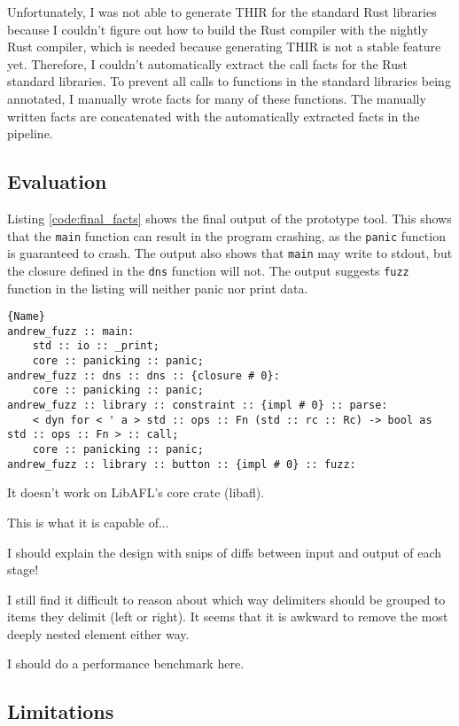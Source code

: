\documentclass[11pt]{article}
\begin{document}
Unfortunately, I was not able to generate THIR for the standard Rust libraries because I couldn't figure out how to build the Rust compiler with the nightly Rust compiler, which is needed because generating THIR is not a stable feature yet.
Therefore, I couldn't automatically extract the call facts for the Rust standard libraries.
To prevent all calls to functions in the standard libraries being annotated, I manually wrote facts for many of these functions.
The manually written facts are concatenated with the automatically extracted facts in the pipeline.

\subsection{Evaluation}

Listing \ref{code:final_facts} shows the final output of the prototype tool.
This shows that the \lstinline{main} function can result in the program crashing, as the \lstinline{panic} function is guaranteed to crash.
The output also shows that \lstinline{main} may write to stdout, but the closure defined in the \lstinline{dns} function will not.
The output suggests \lstinline{fuzz} function in the listing will neither panic nor print data.

\begin{lstlisting}[caption=External Function Annotions, label=code:final_facts]{Name}
andrew_fuzz :: main:
	std :: io :: _print;
	core :: panicking :: panic;
andrew_fuzz :: dns :: dns :: {closure # 0}:
	core :: panicking :: panic;
andrew_fuzz :: library :: constraint :: {impl # 0} :: parse:
	< dyn for < ' a > std :: ops :: Fn (std :: rc :: Rc) -> bool as std :: ops :: Fn > :: call;
	core :: panicking :: panic;
andrew_fuzz :: library :: button :: {impl # 0} :: fuzz:
\end{lstlisting}

It doesn't work on LibAFL's core crate (libafl).

This is what it is capable of...

I should explain the design with snips of diffs between input and output of each stage!

I still find it difficult to reason about which way delimiters should be grouped to items they delimit (left or right).
It seems that it is awkward to remove the most deeply nested element either way.

I should do a performance benchmark here.

\subsection{Limitations}
\end{document}
